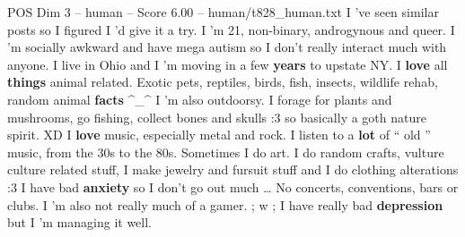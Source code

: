 \begin{textsample}{POS Dim 3 – human – Score 6.00 – human/t828\_human.txt}  \label{ex:f3_pos_005}
I ’ve seen similar posts so I figured I ’d give it a try.
I ’m 21, non-binary, androgynous and queer.
I ’m socially awkward and have mega autism so I don't really interact much with anyone.
I live in Ohio and I ’m moving in a few \textbf{years} to upstate NY.
I \textbf{love} all \textbf{things} animal related.
Exotic pets, reptiles, birds, fish, insects, wildlife rehab, random animal \textbf{facts} ^\_^ I ’m also outdoorsy.
I forage for plants and mushrooms, go fishing, collect bones and skulls :3 so basically a goth nature spirit.
XD I \textbf{love} music, especially metal and rock.
I listen to a \textbf{lot} of “ old ” music, from the 30s to the 80s.
Sometimes I do art.
I do random crafts, vulture culture related stuff, I make jewelry and fursuit stuff and I do clothing alterations :3 I have bad \textbf{anxiety} so I don't go out much … No concerts, conventions, bars or clubs.
I ’m also not really much of a gamer. ; w ; I have really bad \textbf{depression} but I ’m managing it well.

\end{textsample}
